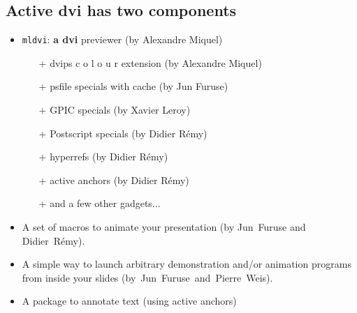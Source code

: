 \documentclass[12pt]{article}
\begin{document}
\newpage


\subsection* {Active dvi has two components}

\begin{itemize}
\item {\tt mldvi}: {\bf a dvi} previewer (by Alexandre Miquel)
\begin {itemize}
\item[+] dvips
  \textcolor{c1}{c}%
  \textcolor{c2}{o}%
  \textcolor{c3}{l}%
  \textcolor{c4}{o}%
  \textcolor{c5}{u}%
  \textcolor{c6}{r}
  extension (by Alexandre Miquel)
\item[+] psfile specials with cache (by Jun Furuse)
\item[+] GPIC specials (by Xavier Leroy)
\item[+] Postscript specials (by Didier R{\'{e}}my)
\item[+] hyperrefs (by Didier R{\'{e}}my)
\item[+] active anchors (by Didier R{\'{e}}my)
\item[+] and a few other gadgets...
\end {itemize}
\end{itemize}

\begin{itemize}
\item 
A set of macros to animate your presentation 
(by Jun~Furuse and Didier~R{\'{e}}my).
 
\item 
A simple way to launch arbitrary demonstration and/or animation
programs from inside your slides
\hbox {(by Jun Furuse and Pierre Weis)}.

\item 
A package to annotate text (using active anchors)
\end{itemize}

\newpage

\def \flash #1{\let \do\leflash \do #1\relax}
\def \leflash #1{\ifx #1\relax \def \do{}\else \def \do {#1\adviwait[0.05]\leflash}\fi \do}

\def\goon{\hbox{{\Large $\Rightarrow$}~Type~space~to~go~on}}
\end{document}
